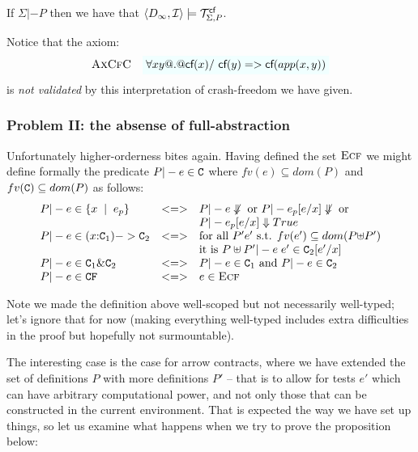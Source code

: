 \documentclass[preprint,nocopyrightspace]{sigplanconf}
\begin{document}
\begin{theorem}
If $\Sigma |- P$ then we have that $\langle D_{\infty},{\cal I}\rangle \models {\cal T}_{\Sigma,P}^{\textsf{cf}}$.
\end{theorem}

Notice that the axiom:
\[  \textsc{AxCfC}  \quad \formula{\forall x y @.@ \lcf{x} /\ \lcf{y} => \lcf{app(x,y)}} \]
is {\em not validated} by this interpretation of crash-freedom we have given. 


\subsubsection{Problem II: the absense of full-abstraction}

Unfortunately higher-orderness bites again. Having defined the set $\textsc{Ecf}$ we might define formally
the predicate $P |- e \in {\tt C}$ where $fv(e) \subseteq dom(P)$ and $fv({\tt C}) \subseteq dom(P)$ as 
follows:
{\setlength{\arraycolsep}{2pt}
\[\begin{array}{lcl}
    P |- e \in \{ x\;\mid\;e_p\} & <=> & P |- e \not\Downarrow \mbox{ or } P |- e_p[e/x] \not\Downarrow \mbox{ or} \\ 
                                 &     & P |- e_p[e/x] \Downarrow True \\
    P |- e \in (x{:}{\tt C}_1) -> {\tt C}_2 & <=> & 
                                 \mbox{for all } P' e' \mbox{ s.t. } fv(e') \subseteq dom(P{\uplus}P')  \\ 
                                   &   &  \mbox{it is } P\uplus P' |- e\;e' \in {\tt C}_2[e'/x] \\
    P |- e \in {\tt C}_1 \& {\tt C}_2 & <=> & P |- e \in {\tt C}_1 \mbox{ and } P |- e \in {\tt C}_2 \\
    P |- e \in {\tt CF}            & <=> & e \in \textsc{Ecf} 
\end{array}\]}

Note we made the definition above well-scoped but not necessarily well-typed; let's ignore that for now (making everything
well-typed includes extra difficulties in the proof but hopefully not surmountable).

The interesting case is the case for arrow contracts, where we have extended the set of definitions $P$ with more 
definitions $P'$ -- that is to allow for tests $e'$ which can have arbitrary computational power, and not only those
that can be constructed in the current environment. That is expected the way we have set up things, so let us examine
what happens when we try to prove the proposition below:
\end{document}
